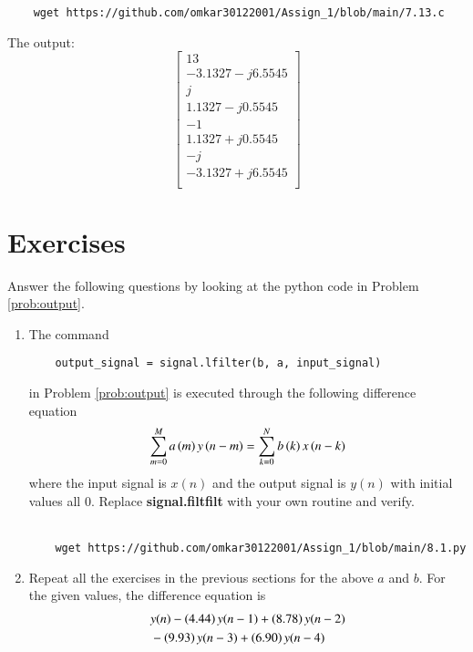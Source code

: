 \documentclass[journal,12pt,twocolumn]{IEEEtran}
\renewcommand\thesection{\arabic{section}}
\begin{document}
\begin{enumerate}[label=\thesection.\arabic*
	,ref=\thesection.\theenumi]
\begin{enumerate}[label=\arabic*.,ref=\thesection.\theenumi]
\begin{lstlisting}
	wget https://github.com/omkar30122001/Assign_1/blob/main/7.13.c
	\end{lstlisting}
The output:
\begin{equation}
	\begin{bmatrix}
		13\\
		-3.1327 - j6.5545\\
		j\\
		1.1327 - j0.5545\\
		-1\\
		1.1327 + j0.5545\\
		- j\\
		-3.1327 + j6.5545\\
	\end{bmatrix}
\end{equation}
\end{enumerate}
\section{Exercises}
Answer the following questions by looking at the python code in Problem \ref{prob:output}.
\begin{enumerate}[label=\thesection.\arabic*]
	\item
	The command
	\begin{lstlisting}
	output_signal = signal.lfilter(b, a, input_signal)
	\end{lstlisting}
	in Problem \ref{prob:output} is executed through the following difference equation
	\begin{equation}
		\label{eq:iir_filter_gen}
		\sum _{m=0}^{M}a\left(m\right)y\left(n-m\right)=\sum _{k=0}^{N}b\left(k\right)x\left(n-k\right)
	\end{equation}
	where the input signal is $x(n)$ and the output signal is $y(n)$ with initial values all 0. Replace
	\textbf{signal.filtfilt} with your own routine and verify.\\
	\solution \\
	\begin{lstlisting}
	wget https://github.com/omkar30122001/Assign_1/blob/main/8.1.py
	\end{lstlisting}
	\item Repeat all the exercises in the previous sections for the above $a$ and $b$.
	\solution For the given values, the difference equation is
\begin{align*}
&y(n) - \brak{4.44}y(n - 1) + \brak{8.78}y(n - 2) \nonumber \\
&- \brak{9.93}y(n - 3) + \brak{6.90}y(n - 4) \nonumber \\

\end{align*}
\end{enumerate}
\end{enumerate}
\end{document}
